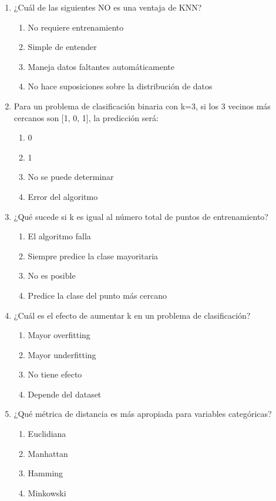 \documentclass[12pt]{article}
\begin{document}
\begin{enumerate}
    \item ¿Cuál de las siguientes NO es una ventaja de KNN?
    \begin{enumerate}
        \item No requiere entrenamiento
        \item Simple de entender
        \item Maneja datos faltantes automáticamente
        \item No hace suposiciones sobre la distribución de datos
    \end{enumerate}
    
    \item Para un problema de clasificación binaria con k=3, si los 3 vecinos más cercanos son [1, 0, 1], la predicción será:
    \begin{enumerate}
        \item 0
        \item 1
        \item No se puede determinar
        \item Error del algoritmo
    \end{enumerate}
    
    \item ¿Qué sucede si k es igual al número total de puntos de entrenamiento?
    \begin{enumerate}
        \item El algoritmo falla
        \item Siempre predice la clase mayoritaria
        \item No es posible
        \item Predice la clase del punto más cercano
    \end{enumerate}
    
    \item ¿Cuál es el efecto de aumentar k en un problema de clasificación?
    \begin{enumerate}
        \item Mayor overfitting
        \item Mayor underfitting
        \item No tiene efecto
        \item Depende del dataset
    \end{enumerate}
    
    \item ¿Qué métrica de distancia es más apropiada para variables categóricas?
    \begin{enumerate}
        \item Euclidiana
        \item Manhattan
        \item Hamming
        \item Minkowski
    \end{enumerate}
\end{enumerate}
\end{document}

